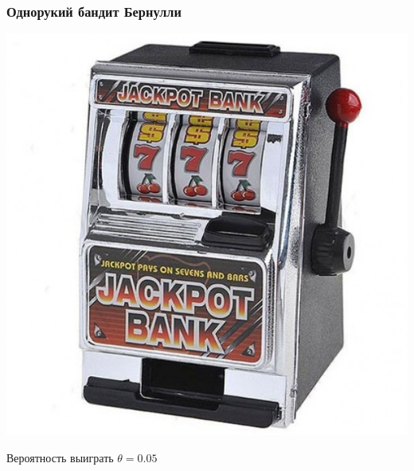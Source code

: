 \documentclass[fullscreen=true, bookmarks=true, hyperref={pdfencoding=unicode}]{beamer}
\begin{document}
\begin{frame}
  \frametitle{Однорукий бандит Бернулли}

  \begin{center}
    \includegraphics[keepaspectratio,
                     width=.5\paperwidth]{data-kopilkabandit.jpg}
  \end{center}

  Вероятность выиграть $\theta = 0.05$
\end{frame}
\end{document}
